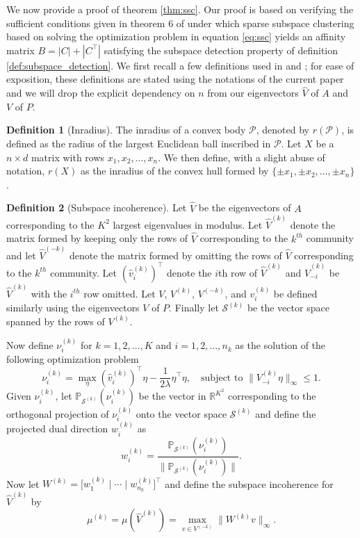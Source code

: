 \documentclass[
  12pt,
]{article}
\theoremstyle{definition}
\newtheorem{definition}{Definition}[section]
\theoremstyle{definition}
\theoremstyle{definition}
\theoremstyle{definition}
\theoremstyle{remark}
\begin{document}
We now provide a proof of theorem \ref{thm:ssc}. Our proof is based on verifying the sufficient conditions given in theorem 6 of \citet{jmlr-v28-wang13} under which sparse subspace clustering based on solving the optimization problem in equation \eqref{eq:ssc} yields an affinity matrix \(B = |C| + |C^{\top}|\) satisfying the subspace detection property of definition \ref{def:subspace_detection}.
We first recall a few definitions used in \citet{soltanolkotabi2012} and \citet{jmlr-v28-wang13};
for ease of exposition, these definitions are stated using the notations of the current paper and we will drop the explicit dependency on \(n\) from our eigenvectors \(\hat{V}\) of \(A\) and \(V\) of \(P\).

\begin{definition}[Inradius]
\label{def:inradius}
The inradius of a convex body $\mathcal{P}$, denoted by $r(\mathcal{P})$, is
defined as the radius of the largest Euclidean ball inscribed in $\mathcal{P}$.
Let $X$ be a $n \times d$ matrix with rows $x_1, x_2, \dots,
x_n$. We then define, with a slight abuse of notation, $r(X)$ as the
inradius of the convex hull formed by $\{\pm x_1, \pm x_2, \dots, \pm x_n\}$. 
\end{definition}

\begin{definition}[Subspace incoherence]
\label{def:subspace_incoherence}
Let $\hat{V}$ be the eigenvectors of $A$
corresponding to the $K^2$ largest eigenvalues in modulus. Let
$\hat{V}^{(k)}$ denote the matrix formed by keeping only the rows of
$\hat{V}$ corresponding to the $k^{th}$
community and let $\hat{V}^{(-k)}$ denote the matrix formed by
omitting the rows of $\hat{V}$
corresponding to the $k^{th}$ community. Let $(\hat{v}_i^{(k)})^\top$ denote
the $i$th row of $\hat{V}^{(k)}$ and $\hat{V}_{-i}^{(k)}$ be $\hat{V}^{(k)}$ with
the $i^{th}$ row omitted. Let $V$, $V^{(k)}$, $V^{(-k)}$, and
$v_i^{(k)}$ be defined similarly using the eigenvectors $V$ of
$P$. Finally let $\mathcal{S}^{(k)}$ be the vector space spanned by the
rows of $V^{(k)}$. 

Now define $\nu_{i}^{(k)}$ for $k = 1,2,\dots,K$ and $i =
1,2,\dots,n_{k}$ as the solution of the following optimization problem
$$\nu_{i}^{(k)} = \max_\eta (\hat{v}_i^{(k)})^\top \eta - \frac{1}{2
\lambda} \eta^\top \eta, \quad \text{subject to $\|V_{-i}^{(k)}
\eta\|_\infty \leq 1$.}$$
Given $\nu_i^{(k)}$, let $\mathbb{P}_{\mathcal{S}^{(k)}}(\nu_i^{(k)})$
be the vector in $\mathbb{R}^{K^2}$ corresponding to the orthogonal projection of $\nu_i^{(k)}$ onto the vector space
$\mathcal{S}^{(k)}$ and define the projected dual direction $w_{i}^{(k)}$
as
$$w_i^{(k)} =
\frac{\mathbb{P}_{\mathcal{S}^{(k)}}(\nu_i^{(k)})}{\|\mathbb{P}_{\mathcal{S}^{(k)}}(\nu_i^{(k)})\|}.$$
Now let $W^{(k)} = \bigl[ w_1^{(k)} \mid \cdots \mid w_{n_k}^{(k)} \bigr]^\top$
and define the subspace incoherence for $\hat{V}^{(k)}$ by
$$\mu^{(k)} = \mu(\hat{V}^{(k)}) = \max\limits_{v \in V^{(-k)}} \|W^{(k)} v\|_\infty.$$
\end{definition}
\end{document}
